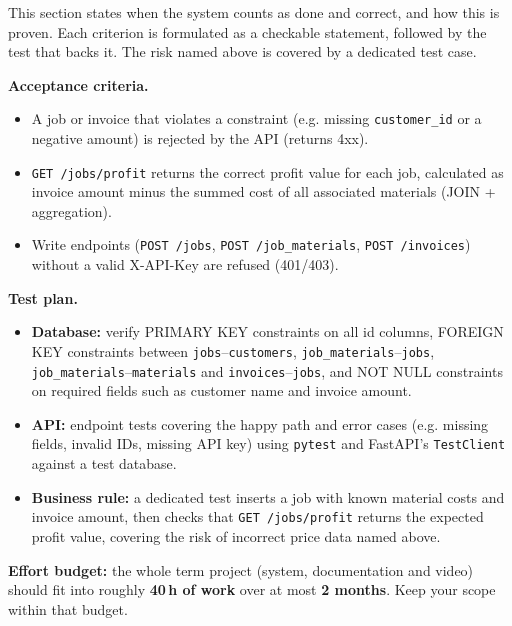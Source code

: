 \documentclass[11pt,a4paper]{article}
\begin{document}
This section states when the system counts as done and correct, and how this
is proven. Each criterion is formulated as a checkable statement, followed by
the test that backs it. The risk named above is covered by a dedicated test
case.

\textbf{Acceptance criteria.}
\begin{itemize}[topsep=2pt]
  \item A job or invoice that violates a constraint (e.g. missing
        \texttt{customer\_id} or a negative amount) is rejected by the API
        (returns 4xx).
  \item \texttt{GET /jobs/profit} returns the correct profit value for each
        job, calculated as invoice amount minus the summed cost of all
        associated materials (JOIN + aggregation).
  \item Write endpoints (\texttt{POST /jobs}, \texttt{POST /job\_materials},
        \texttt{POST /invoices}) without a valid X-API-Key are refused
        (401/403).
\end{itemize}

\textbf{Test plan.}
\begin{itemize}[topsep=2pt]
  \item \textbf{Database:} verify PRIMARY KEY constraints on all id columns,
        FOREIGN KEY constraints between \texttt{jobs}--\texttt{customers},
        \texttt{job\_materials}--\texttt{jobs},
        \texttt{job\_materials}--\texttt{materials} and
        \texttt{invoices}--\texttt{jobs}, and NOT NULL constraints on
        required fields such as customer name and invoice amount.
  \item \textbf{API:} endpoint tests covering the happy path and error cases
        (e.g. missing fields, invalid IDs, missing API key) using
        \texttt{pytest} and FastAPI's \texttt{TestClient} against a test
        database.
  \item \textbf{Business rule:} a dedicated test inserts a job with known
        material costs and invoice amount, then checks that
        \texttt{GET /jobs/profit} returns the expected profit value,
        covering the risk of incorrect price data named above.
\end{itemize}

\vspace{1em}
\begin{infobox}
\textbf{Effort budget:} the whole term project (system, documentation and video)
should fit into roughly \textbf{40\,h of work} over at most \textbf{2 months}.
Keep your scope within that budget.
\end{infobox}
\end{document}
